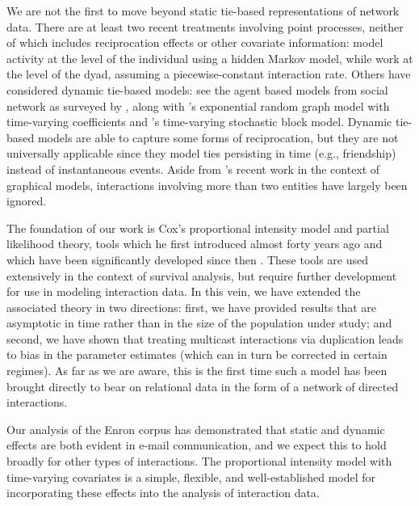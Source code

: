 \documentclass[final]{statsoc}
\begin{document}
We are not the first to move beyond static tie-based representations of
network data.  There are at least two recent treatments involving point processes,
neither of which includes reciprocation effects or other covariate
information: \citet{malmgen2009characterizing} model activity at the level of
the individual using a hidden Markov model, while \citet{heard2010bayesian} work
at the level of the dyad, assuming a piecewise-constant interaction rate.
Others have considered dynamic tie-based models: see the
agent based models from social network as surveyed by
\citet{snijders2010introduction}, along with
's \citeyearpar{hanneke2010discrete}
exponential random graph model with time-varying coefficients and
's \citeyearpar{kolar2010estimating}
time-varying stochastic block model.  Dynamic tie-based models are able
to capture some forms of reciprocation, but they are not universally
applicable since they model ties persisting in time (e.g., friendship)
instead of instantaneous events.
Aside from 's \citeyearpar{lunagomez2009geometric} recent
work in the context of graphical models, interactions involving more than two
entities have largely been ignored.

The foundation of our work is Cox's \citeyearpar{cox1972regression}
proportional intensity model and
partial likelihood theory, tools which he first introduced almost
forty years ago and which have been significantly developed since
then \citep{cox1975partial, fleming1991counting, andersen1993statistical, martinussen2006dynamic, cook2007statistical}.
These tools are used extensively in the context of survival analysis, but
require further development for use in modeling interaction data.
In this vein, we have extended the associated theory in
two directions: first, we have provided results that are asymptotic in time
rather than in the size of the population under study; and second, we
have shown that treating multicast interactions via duplication leads to
bias in the parameter estimates (which can in turn be corrected in
certain regimes).  As far as we are aware, this is the first time
such a model has been brought directly to bear on relational data in
the form of a network of directed interactions.

Our analysis of the Enron corpus has demonstrated that static and
dynamic effects are both evident in e-mail communication, and we expect this
to hold broadly for other types of interactions.  The proportional intensity
model with time-varying covariates is a simple, flexible, and
well-established model for incorporating these effects into the analysis
of interaction data.
\end{document}
